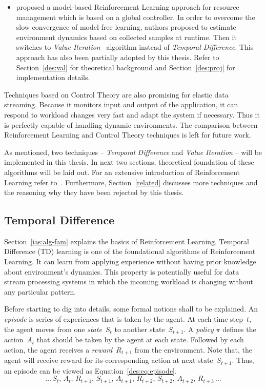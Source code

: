 \begin{description}[leftmargin=0pt]
\begin{itemize}
        \item \textcite{dutreilh:hal-01122123} proposed a model-based Reinforcement Learning approach for resource management which is based on a global controller. In order to overcome the slow convergence of model-free learning, authors proposed to estimate environment dynamics based on collected samples at runtime. Then it switches to \emph{Value Iteration}~\cite{rlIntro} algorithm instead of \emph{Temporal Difference}. This approach has also been partially adopted by this thesis. Refer to Section~\ref{des:val} for theoretical background and Section~\ref{des:proj} for implementation details.
    \end{itemize}
    \item[Control Theory] Techniques based on Control Theory are also promising for elastic data streaming. Because it monitors input and output of the application, it can respond to workload changes very fast and adapt the system if necessary. Thus it is perfectly capable of handling dynamic environments. The comparison between Reinforcement Learning and Control Theory techniques is left for future work.
\end{description}
As mentioned, two techniques -- \emph{Temporal Difference} and \emph{Value Iteration} -- will be implemented in this thesis. In next two sections, theoretical foundation of these algorithms will be laid out. For an extensive introduction of Reinforcement Learning refer to~\textcite{rlIntro}. Furthermore, Section~\ref{related} discusses more techniques and the reasoning why they have been rejected by this thesis.
\subsection{Temporal Difference}
\label{des:temp}
Section~\ref{ias:alg-fam} explains the basics of Reinforcement Learning. Temporal Difference (TD) learning is one of the foundational algorithms of Reinforcement Learning. It can learn from applying experience without having prior knowledge about environment's dynamics. This property is potentially useful for data stream processing systems in which the incoming workload is changing without any particular pattern.

Before starting to dig into details, some formal notions shall to be explained. An \emph{episode} is series of experiences that is taken by the agent. At each time step~$t$, the agent moves from one \emph{state}~$S_t$ to another state~$S_{t+1}$. A \emph{policy} $\pi$ defines the action~$A_t$ that should be taken by the agent at each state. Followed by each action, the agent receives a \emph{reward}~$R_{t+1}$ from the environment. Note that, the agent will receive reward for its corresponding action at next state~$S_{t+1}$. Thus, an episode can be viewed as Equation~\ref{des:eq:episode}.
\begin{equation}
\dots\,S_t,\,A_t,\,R_{t+1},\,S_{t+1},\,A_{t+1},\,R_{t+2},\,S_{t+2},\,A_{t+2},\,R_{t+3}\,\dots
\label{des:eq:episode}
\end{equation}

